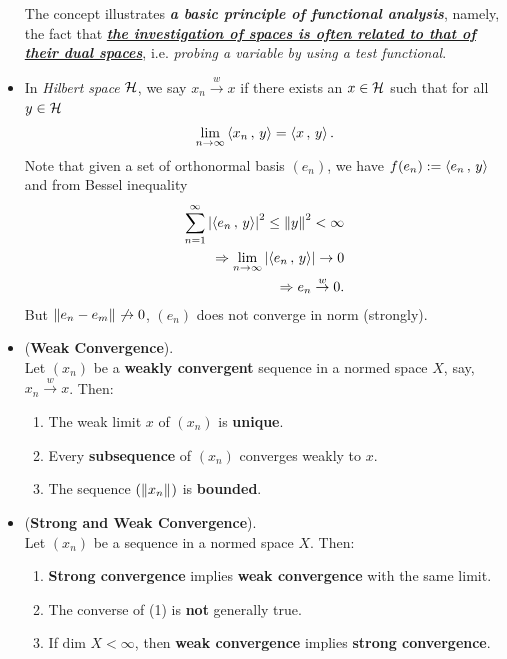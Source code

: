 \documentclass[11pt]{article}
\begin{document}
\begin{itemize}
\begin{remark}
The concept illustrates \emph{\textbf{a basic principle of functional analysis}}, namely, the fact that \underline{\textbf{\emph{the investigation of spaces is often related to that of their dual spaces}}}, i.e. \emph{probing a variable by using a test functional}.
\end{remark}

\item \begin{remark}
In \emph{Hilbert space} ${\mathcal H}$, we say $x_n \stackrel{w}{\rightarrow} x$ if there exists an $x\in {\mathcal H}$ such that for all $y \in {\mathcal H}$
\begin{align*}
\lim\limits_{n\rightarrow \infty} \left\langle x_n\,,\, y \right\rangle = \left\langle x\,,\, y \right\rangle.
\end{align*} Note that given a set of orthonormal basis $(e_n)$, we have $f(e_n):= \left\langle e_n\,,\, y \right\rangle$ and from Bessel inequality
\begin{align*}
\sum_{n=1}^{\infty}\left\lvert \left\langle e_n\,,\, y \right\rangle \right\rvert^2 \le \left\|y\right\|_{}^2 < \infty \\
\Rightarrow \lim\limits_{n\rightarrow \infty}\left\lvert \left\langle e_n\,,\, y \right\rangle \right\rvert \rightarrow 0 \\
\Rightarrow e_n \stackrel{w}{\rightarrow} 0.
\end{align*} But $\left\|e_n - e_{m}\right\|_{} \not\rightarrow 0$, $(e_n)$ does not converge in norm (strongly).
\end{remark}

\item \begin{lemma}  (\textbf{Weak Convergence}).\\
Let $(x_n)$ be a \textbf{weakly convergent} sequence in a normed space $X$, say, $x_n \stackrel{w}{\rightarrow} x$. Then:
\begin{enumerate}
\item The weak limit $x$ of $(x_n)$ is \textbf{unique}.
\item Every \textbf{subsequence} of $(x_n)$ converges weakly to $x$.
\item The sequence $(\left\|x_n\right\|_{})$ is \textbf{bounded}.
\end{enumerate}
\end{lemma}

\item \begin{proposition} (\textbf{Strong and Weak Convergence}).  \citep{kreyszig1989introductory}\\
Let $(x_n)$ be a sequence in a normed space $X$. Then:
\begin{enumerate}
\item \textbf{Strong convergence} implies \textbf{weak convergence} with the same limit.
\item The converse of (1) is \textbf{not} generally true.
\item If $\text{dim }X < \infty$, then \textbf{weak convergence} implies\textbf{ strong convergence}.
\end{enumerate}
\end{proposition}


\end{itemize}
\end{document}
